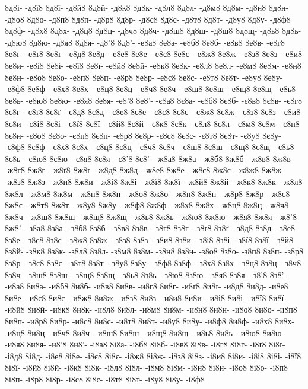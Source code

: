 {8д8і-
-д8ї8
8д8ї-
-д8й8
8д8й-
-д8к8
8д8к-
-д8л8
8д8л-
-д8м8
8д8м-
-д8н8
8д8н-
-д8о8
8д8о-
-д8п8
8д8п-
-д8р8
8д8р-
-д8с8
8д8с-
-д8т8
8д8т-
-д8у8
8д8у-
-д8ф8
8д8ф-
-д8х8
8д8х-
-д8ц8
8д8ц-
-д8ч8
8д8ч-
-д8ш8
8д8ш-
-д8щ8
8д8щ-
-д8ь8
8д8ь-
-д8ю8
8д8ю-
-д8я8
8д8я-
-д8'8
8д8'-
-е8а8
8е8а-
-е8б8
8е8б-
-е8в8
8е8в-
-е8г8
8е8г-
-е8ґ8
8е8ґ-
-е8д8
8е8д-
-е8е8
8е8е-
-е8є8
8е8є-
-е8ж8
8е8ж-
-е8з8
8е8з-
-е8и8
8е8и-
-е8і8
8е8і-
-е8ї8
8е8ї-
-е8й8
8е8й-
-е8к8
8е8к-
-е8л8
8е8л-
-е8м8
8е8м-
-е8н8
8е8н-
-е8о8
8е8о-
-е8п8
8е8п-
-е8р8
8е8р-
-е8с8
8е8с-
-е8т8
8е8т-
-е8у8
8е8у-
-е8ф8
8е8ф-
-е8х8
8е8х-
-е8ц8
8е8ц-
-е8ч8
8е8ч-
-е8ш8
8е8ш-
-е8щ8
8е8щ-
-е8ь8
8е8ь-
-е8ю8
8е8ю-
-е8я8
8е8я-
-е8'8
8е8'-
-є8а8
8є8а-
-є8б8
8є8б-
-є8в8
8є8в-
-є8г8
8є8г-
-є8ґ8
8є8ґ-
-є8д8
8є8д-
-є8е8
8є8е-
-є8є8
8є8є-
-є8ж8
8є8ж-
-є8з8
8є8з-
-є8и8
8є8и-
-є8і8
8є8і-
-є8ї8
8є8ї-
-є8й8
8є8й-
-є8к8
8є8к-
-є8л8
8є8л-
-є8м8
8є8м-
-є8н8
8є8н-
-є8о8
8є8о-
-є8п8
8є8п-
-є8р8
8є8р-
-є8с8
8є8с-
-є8т8
8є8т-
-є8у8
8є8у-
-є8ф8
8є8ф-
-є8х8
8є8х-
-є8ц8
8є8ц-
-є8ч8
8є8ч-
-є8ш8
8є8ш-
-є8щ8
8є8щ-
-є8ь8
8є8ь-
-є8ю8
8є8ю-
-є8я8
8є8я-
-є8'8
8є8'-
-ж8а8
8ж8а-
-ж8б8
8ж8б-
-ж8в8
8ж8в-
-ж8г8
8ж8г-
-ж8ґ8
8ж8ґ-
-ж8д8
8ж8д-
-ж8е8
8ж8е-
-ж8є8
8ж8є-
-ж8ж8
8ж8ж-
-ж8з8
8ж8з-
-ж8и8
8ж8и-
-ж8і8
8ж8і-
-ж8ї8
8ж8ї-
-ж8й8
8ж8й-
-ж8к8
8ж8к-
-ж8л8
8ж8л-
-ж8м8
8ж8м-
-ж8н8
8ж8н-
-ж8о8
8ж8о-
-ж8п8
8ж8п-
-ж8р8
8ж8р-
-ж8с8
8ж8с-
-ж8т8
8ж8т-
-ж8у8
8ж8у-
-ж8ф8
8ж8ф-
-ж8х8
8ж8х-
-ж8ц8
8ж8ц-
-ж8ч8
8ж8ч-
-ж8ш8
8ж8ш-
-ж8щ8
8ж8щ-
-ж8ь8
8ж8ь-
-ж8ю8
8ж8ю-
-ж8я8
8ж8я-
-ж8'8
8ж8'-
-з8а8
8з8а-
-з8б8
8з8б-
-з8в8
8з8в-
-з8г8
8з8г-
-з8ґ8
8з8ґ-
-з8д8
8з8д-
-з8е8
8з8е-
-з8є8
8з8є-
-з8ж8
8з8ж-
-з8з8
8з8з-
-з8и8
8з8и-
-з8і8
8з8і-
-з8ї8
8з8ї-
-з8й8
8з8й-
-з8к8
8з8к-
-з8л8
8з8л-
-з8м8
8з8м-
-з8н8
8з8н-
-з8о8
8з8о-
-з8п8
8з8п-
-з8р8
8з8р-
-з8с8
8з8с-
-з8т8
8з8т-
-з8у8
8з8у-
-з8ф8
8з8ф-
-з8х8
8з8х-
-з8ц8
8з8ц-
-з8ч8
8з8ч-
-з8ш8
8з8ш-
-з8щ8
8з8щ-
-з8ь8
8з8ь-
-з8ю8
8з8ю-
-з8я8
8з8я-
-з8'8
8з8'-
-и8а8
8и8а-
-и8б8
8и8б-
-и8в8
8и8в-
-и8г8
8и8г-
-и8ґ8
8и8ґ-
-и8д8
8и8д-
-и8е8
8и8е-
-и8є8
8и8є-
-и8ж8
8и8ж-
-и8з8
8и8з-
-и8и8
8и8и-
-и8і8
8и8і-
-и8ї8
8и8ї-
-и8й8
8и8й-
-и8к8
8и8к-
-и8л8
8и8л-
-и8м8
8и8м-
-и8н8
8и8н-
-и8о8
8и8о-
-и8п8
8и8п-
-и8р8
8и8р-
-и8с8
8и8с-
-и8т8
8и8т-
-и8у8
8и8у-
-и8ф8
8и8ф-
-и8х8
8и8х-
-и8ц8
8и8ц-
-и8ч8
8и8ч-
-и8ш8
8и8ш-
-и8щ8
8и8щ-
-и8ь8
8и8ь-
-и8ю8
8и8ю-
-и8я8
8и8я-
-и8'8
8и8'-
-і8а8
8і8а-
-і8б8
8і8б-
-і8в8
8і8в-
-і8г8
8і8г-
-і8ґ8
8і8ґ-
-і8д8
8і8д-
-і8е8
8і8е-
-і8є8
8і8є-
-і8ж8
8і8ж-
-і8з8
8і8з-
-і8и8
8і8и-
-і8і8
8і8і-
-і8ї8
8і8ї-
-і8й8
8і8й-
-і8к8
8і8к-
-і8л8
8і8л-
-і8м8
8і8м-
-і8н8
8і8н-
-і8о8
8і8о-
-і8п8
8і8п-
-і8р8
8і8р-
-і8с8
8і8с-
-і8т8
8і8т-
-і8у8
8і8у-
-і8ф8
}
